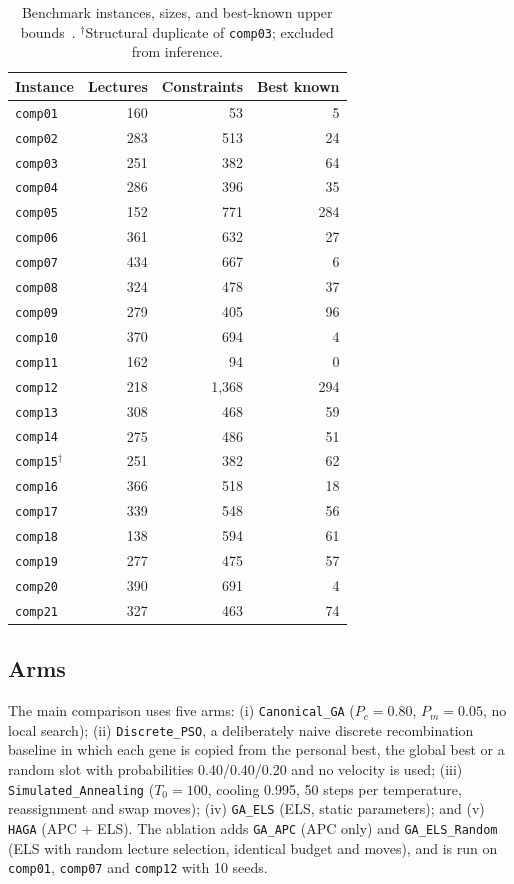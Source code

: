 \documentclass[journal]{IEEEtran}
\newcommand{\code}[1]{\texttt{#1}}
\begin{document}
\begin{table}[!t]
\caption{Benchmark instances, sizes, and best-known upper bounds~\cite{ceschia2022educational}. $^\dagger$Structural duplicate of \code{comp03}; excluded from inference.}
\label{tab:instances}
\centering
\small
\begin{tabular}{l r r r}
\toprule
Instance & Lectures & Constraints & Best known \\
\midrule
\code{comp01} & 160 & 53 & 5 \\
\code{comp02} & 283 & 513 & 24 \\
\code{comp03} & 251 & 382 & 64 \\
\code{comp04} & 286 & 396 & 35 \\
\code{comp05} & 152 & 771 & 284 \\
\code{comp06} & 361 & 632 & 27 \\
\code{comp07} & 434 & 667 & 6 \\
\code{comp08} & 324 & 478 & 37 \\
\code{comp09} & 279 & 405 & 96 \\
\code{comp10} & 370 & 694 & 4 \\
\code{comp11} & 162 & 94 & 0 \\
\code{comp12} & 218 & 1{,}368 & 294 \\
\code{comp13} & 308 & 468 & 59 \\
\code{comp14} & 275 & 486 & 51 \\
\code{comp15}$^\dagger$ & 251 & 382 & 62 \\
\code{comp16} & 366 & 518 & 18 \\
\code{comp17} & 339 & 548 & 56 \\
\code{comp18} & 138 & 594 & 61 \\
\code{comp19} & 277 & 475 & 57 \\
\code{comp20} & 390 & 691 & 4 \\
\code{comp21} & 327 & 463 & 74 \\
\bottomrule
\end{tabular}
\end{table}

\subsection{Arms}
The main comparison uses five arms: (i) \code{Canonical\_GA} ($P_c=0.80$, $P_m=0.05$, no local search); (ii) \code{Discrete\_PSO}, a deliberately naive discrete recombination baseline in which each gene is copied from the personal best, the global best or a random slot with probabilities 0.40/0.40/0.20 and no velocity is used; (iii) \code{Simulated\_Annealing} ($T_0=100$, cooling 0.995, 50 steps per temperature, reassignment and swap moves); (iv) \code{GA\_ELS} (ELS, static parameters); and (v) \code{HAGA} (APC + ELS). The ablation adds \code{GA\_APC} (APC only) and \code{GA\_ELS\_Random} (ELS with random lecture selection, identical budget and moves), and is run on \code{comp01}, \code{comp07} and \code{comp12} with 10 seeds.
\end{document}
